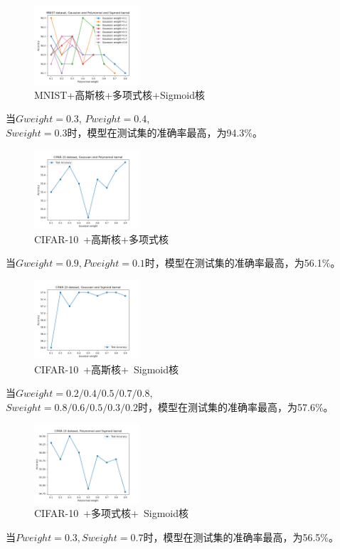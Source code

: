\documentclass[a4paper]{article}
\begin{document}
\begin{figure}[H]
    \centering
    \includegraphics[width=0.35\textwidth]{pictures/multi kernel/MNIST+高斯核+多项式核+sigmoid核.png}
    \caption{MNIST+高斯核+多项式核+Sigmoid核}
\end{figure}
当$Gweight=0.3$, $Pweight=0.4$, \\$Sweight=0.3$时，模型在测试集的准确率最高，为94.3\%。

\begin{figure}[H]
    \centering
    \includegraphics[width=0.35\textwidth]{pictures/multi kernel/CIFAR10+高斯核+多项式核.png}
    \caption{CIFAR-10\ +高斯核+多项式核}
\end{figure}
当$Gweight=0.9, Pweight=0.1$时，模型在测试集的准确率最高，为56.1\%。

\begin{figure}[H]
    \centering
    \includegraphics[width=0.35\textwidth]{pictures/multi kernel/CIFAR10+高斯核+sigmoid核.png}
    \caption{CIFAR-10\ +高斯核+\ Sigmoid核}
\end{figure}
当$Gweight=0.2/0.4/0.5/0.7/0.8$, \\$Sweight=0.8/0.6/0.5/0.3/0.2$时，模型在测试集的准确率最高，为57.6\%。

\begin{figure}[H]
    \centering
    \includegraphics[width=0.35\textwidth]{pictures/multi kernel/CIFAR10+多项式核+sigmoid核.png}
    \caption{CIFAR-10\ +多项式核+\ Sigmoid核}
\end{figure}
当$Pweight=0.3, Sweight=0.7$时，模型在测试集的准确率最高，为56.5\%。
\end{document}
